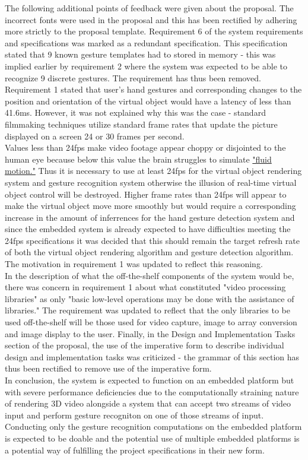 The following additional points of feedback were given about the proposal. The incorrect fonts were used in the proposal and this has been rectified by adhering more strictly to the proposal template. Requirement 6 of the system requirements and specifications was marked as a redundant specification. This specification stated that 9 known gesture templates had to stored in memory - this was implied earlier by requirement 2 where the system was expected to be able to recognize 9 discrete gestures. The requirement has thus been removed. Requirement 1 stated that user's hand gestures and corresponding changes to the position and orientation of the virtual object would have a latency of less than 41.6ms. However, it was not explained why this was the case - standard filmmaking techniques utilize standard frame rates that update the picture displayed on a screen 24 or 30 frames per second.\\

Values less than 24fps make video footage appear choppy or disjointed to the human eye because below this value the brain struggles to simulate \href{https://gamut.io/why-frame-rate-matters-24fps-vs-30fps/}{"fluid motion."} Thus it is necessary to use at least 24fps for the virtual object rendering system and gesture recognition system otherwise the illusion of real-time virtual object control will be destroyed. Higher frame rates than 24fps will appear to make the virtual object move more smoothly but would require a corresponding increase in the amount of inferrences for the hand gesture detection system and since the embedded system is already expected to have difficulties meeting the 24fps specifications it was decided that this should remain the target refresh rate of both the virtual object rendering algorithm and gesture detection algorithm. The motivation in requirement 1 was updated to reflect this reasoning. \\

In the description of what the off-the-shelf components of the system would be, there was concern in requirement 1 about what constituted "video processing libraries" as only "basic low-level operations may be done with the assistance of libraries." The requirement was updated to reflect that the only libraries to be used off-the-shelf will be those used for video capture, image to array conversion and image display to the user. Finally, in the Design and Implementation Tasks section of the proposal, the use of the imperative form to describe individual design and implementation tasks was criticized - the grammar of this section has thus been rectified to remove use of the imperative form.\\

In conclusion, the system is expected to function on an embedded platform but with severe performance deficiencies due to the computationally straining nature of rendering 3D video alongside a system that can accept two streams of video input and perform gesture recogniton on one of those streams of input. Conducting only the gesture recognition computations on the embedded platform is expected to be doable and the potential use of multiple embedded platforms is a potential way of fulfilling the project specifications in their new form.\\